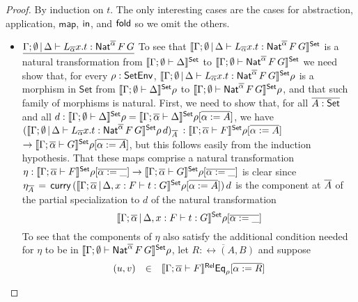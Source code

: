 \documentclass[acmsmall,review,anonymous]{acmart}
\theoremstyle{definition}
\newcommand{\set}{\mathsf{Set}}
\newcommand{\map}{\mathsf{map}}
\begin{document}
\begin{proof}
By induction on $t$. The only interesting cases are the cases for
abstraction, application, $\map$, $\mathsf{in}$, and $\mathsf{fold}$ so we omit the
others.   
\begin{itemize}


\item 
$\underline{\Gamma; \emptyset \,|\, \Delta \vdash L_{\overline{\alpha}}
  x.t : \mathsf{Nat}^{\overline{\alpha}} \,F \,G}$ \;
  To see that $\setsem{\Gamma; \emptyset
    \,|\, \Delta \vdash L_{\overline{\alpha}} x.t :
    \Nat^{\overline{\alpha}} \,F \,G}$ is a natural transformation
  from $\setsem{\Gamma; \emptyset \vdash \Delta}$ to
  $\setsem{\Gamma; \emptyset \vdash \Nat^{\overline{\alpha}} \,F \,G}$
  we need show that, for every $\rho : \mathsf{SetEnv}$,
  $\setsem{\Gamma; \emptyset \,|\, \Delta \vdash L_{\overline{\alpha}}
    x.t : \Nat^{\overline{\alpha}} \,F \,G}\rho$ is a morphism in
  $\set$ from $\setsem{\Gamma; \emptyset \vdash \Delta}\rho$ to
  $\setsem{\Gamma; \emptyset \vdash \Nat^{\overline{\alpha}} \,F
    \,G}\rho$, and that such family of morphisms is natural.
  First, we need to show that, for all $\ol{A : \set}$ and all $d :
  \setsem{\Gamma; \emptyset \vdash \Delta}\rho = \setsem{\Gamma;
    \ol{\alpha} \vdash \Delta}\rho[\overline{\alpha := A}]$, we have
  $(\setsem{\Gamma; \emptyset \,|\, \Delta \vdash L_{\overline{\alpha}}
    x.t : \Nat^{\overline{\alpha}} \,F \,G}\rho\,d)_{\ol{A}}$ $:
  \setsem{\Gamma; \ol{\alpha} \vdash F}\rho[\overline{\alpha := A}]$
  $\to \setsem{\Gamma; \ol{\alpha} \vdash G}\rho[\overline{\alpha :=
      A}]$, but this follows easily from the induction hypothesis.
That these maps comprise a natural transformation $\eta :
\setsem{\Gamma; \ol{\alpha} \vdash F}\rho[\overline{\alpha := \_}] \to
\setsem{\Gamma; \ol{\alpha} \vdash G}\rho[\overline{\alpha := \_}]$ is
clear since $\eta_{\ol{A}} \, = \, \curry\,
(\setsem{\Gamma; \overline{\alpha} \,|\, \Delta, x : F \vdash t:
  G}\rho[\overline{\alpha := A}])\,d$ is the component at $\overline{A}$ of
the partial specialization to $d$ of the natural transformation
$$\setsem{\Gamma; \overline{\alpha} \,|\, \Delta, x : F \vdash t:
  G}\rho[\overline{\alpha := \_}]$$  To see that the components of
$\eta$ also satisfy the additional condition needed for $\eta$ to
be in $\setsem{\Gamma; \emptyset \vdash \Nat^{\overline{\alpha}} \,F
  \,G}\rho$, let $\overline{R : \rel(A, B)}$ and suppose
\[\begin{array}{lll}
(u, v) &  \in & \llbracket{\Gamma;\overline{\alpha} \vdash F}\rrbracket^{\mathsf{Rel}}
\mathsf{Eq}_{\rho}[\overline{\alpha := R}]\\

\end{array}\]
\end{itemize}
\end{proof}
\end{document}
